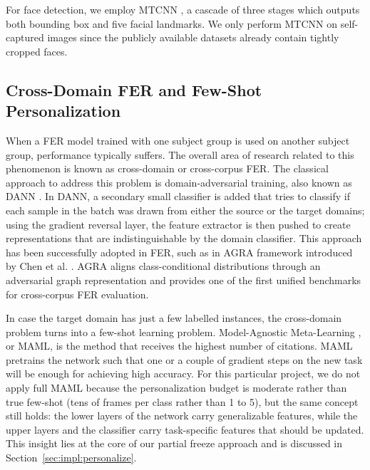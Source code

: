 \documentclass[12pt,a4paper]{article}
\begin{document}
For face detection, we employ MTCNN \autocite{zhang2016mtcnn}, a cascade of three stages which outputs both bounding box and five facial landmarks. We only perform MTCNN on self-captured images since the publicly available datasets already contain tightly cropped faces.

\subsection{Cross-Domain FER and Few-Shot Personalization}
\label{sec:litrev:crossdomain}

When a FER model trained with one subject group is used on
another subject group, performance typically suffers. The overall
area of research related to this phenomenon is known as cross-domain
or cross-corpus FER. The classical approach to address this
problem is domain-adversarial training, also known as DANN
\autocite{ganin2015dann}. In DANN, a secondary small classifier
is added that tries to classify if each sample in the batch was
drawn from either the source or the target domains; using the
gradient reversal layer, the feature extractor is then pushed
to create representations that are indistinguishable by the domain
classifier. This approach has been successfully adopted in FER,
such as in AGRA framework introduced by Chen et al.
\autocite{chen2021agra}. AGRA aligns
class-conditional distributions through an adversarial graph
representation and provides one of the first unified
benchmarks for cross-corpus FER evaluation.

In case the target domain has just a few labelled instances,
the cross-domain problem turns into a few-shot learning problem.
Model-Agnostic Meta-Learning \autocite{finn2017maml},
or MAML, is the method that receives the highest number of citations.
MAML pretrains the network such that one or a couple of gradient
steps on the new task will be enough for achieving high accuracy.
For this particular project, we do not apply full MAML because the
personalization budget is moderate rather than true few-shot
(tens of frames per class rather than 1 to 5), but the same concept
still holds: the lower layers of the network carry generalizable
features, while the upper layers and the classifier carry task-specific
features that should be updated. This insight lies at the core of
our partial freeze approach and is discussed in Section~\ref{sec:impl:personalize}.

\end{document}
